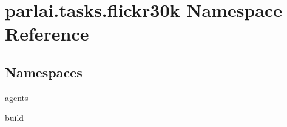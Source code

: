 \hypertarget{namespaceparlai_1_1tasks_1_1flickr30k}{}\section{parlai.\+tasks.\+flickr30k Namespace Reference}
\label{namespaceparlai_1_1tasks_1_1flickr30k}
\subsection*{Namespaces}
\begin{DoxyCompactItemize}
\item 
 \hyperlink{namespaceparlai_1_1tasks_1_1flickr30k_1_1agents}{agents}
\item 
 \hyperlink{namespaceparlai_1_1tasks_1_1flickr30k_1_1build}{build}
\end{DoxyCompactItemize}
